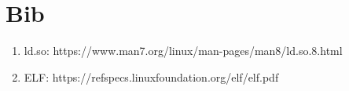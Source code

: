 \documentclass{article}
\begin{document}
%
%


\section*{Bib}

    \begin{enumerate}
        \item ld.so: https://www.man7.org/linux/man-pages/man8/ld.so.8.html
        \item ELF: https://refspecs.linuxfoundation.org/elf/elf.pdf
    \end{enumerate}
\end{document}
